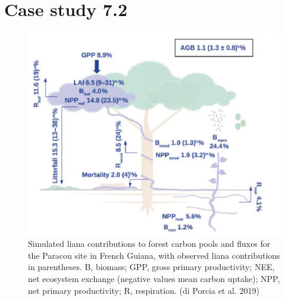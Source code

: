 \documentclass[
  12pt,
  oneside]{book}
\begin{document}
\hypertarget{case-study-7.2}{%
\section{Case study 7.2}\label{case-study-7.2}}

\begin{figure}

{\centering \includegraphics[width=0.8\linewidth]{figures/chap7/f722_porcia1} 

}

\caption{Simulated liana contributions to forest carbon pools and fluxes for the Paracou site in French Guiana, with observed liana contributions in parentheses. B, biomass; GPP, gross primary productivity; NEE, net ecosystem exchange (negative values mean carbon uptake); NPP, net primary productivity; R, respiration. (di Porcia et al. 2019) }\label{fig:f722}
\end{figure}
\end{document}
